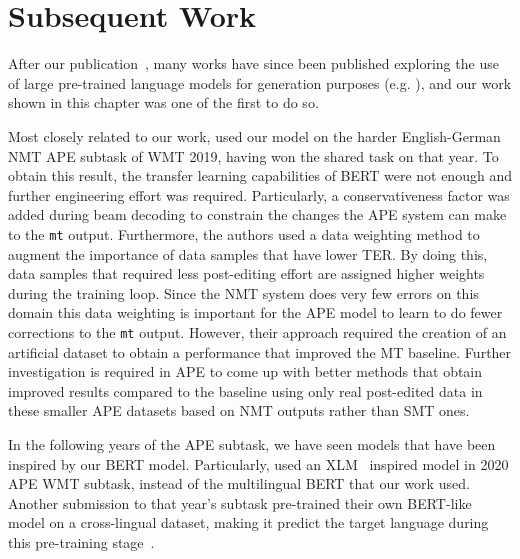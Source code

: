 \section{Subsequent Work}

After our publication~\citep{Correia2019}, many works have since been
published exploring the use of large pre-trained language models for
generation purposes (e.g.
\citep{zhang2019PretrainingBasedNaturalLanguage,
  chen2020DistillingKnowledgeLearned}), and our work shown in this
chapter was one of the first to do so. %

Most closely related to our work, \citet{lopes2019unbabels} used our
model on the harder English-German NMT APE subtask of WMT 2019,
having won the shared task on that year. To obtain this result, the
transfer learning capabilities of BERT were not enough and further
engineering effort was required. Particularly, a conservativeness
factor was added during beam decoding to constrain the changes the
APE system can make to the {\tt mt} output. Furthermore, the authors
used a data weighting method to augment the importance of data
samples that have lower TER. By doing this, data samples that
required less post-editing effort are assigned higher weights during
the training loop. Since the NMT system does very few errors on this
domain this data weighting is important for the APE model to learn to
do fewer corrections to the {\tt mt} output. However, their approach
required the creation of an artificial dataset to obtain a
performance that improved the MT baseline. Further investigation is
required in APE to come up with better methods that obtain improved
results compared to the baseline using only real post-edited data in
these smaller APE datasets based on NMT outputs rather than SMT ones.

In the following years of the APE subtask, we have seen models that
have been inspired by our BERT model. Particularly,
\citet{lee2020POSTECHETRISubmissionWMT2020} used an
XLM~\citep{lample2019xlm} inspired model in 2020 APE WMT subtask,
instead of the multilingual BERT that our work used. Another
submission to that year's subtask pre-trained their own BERT-like
model on a cross-lingual dataset, making it predict the target
language during this pre-training
stage~\citep{wang2020AlibabaSubmissionWMT}.

